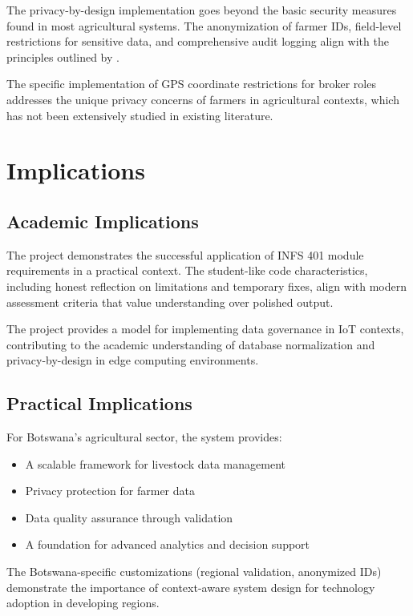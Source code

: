 The privacy-by-design implementation goes beyond the basic security measures found in most agricultural systems. The anonymization of farmer IDs, field-level restrictions for sensitive data, and comprehensive audit logging align with the principles outlined by \cite{cavoukian2011privacy}.

The specific implementation of GPS coordinate restrictions for broker roles addresses the unique privacy concerns of farmers in agricultural contexts, which has not been extensively studied in existing literature.

\section{Implications}

\subsection{Academic Implications}

The project demonstrates the successful application of INFS 401 module requirements in a practical context. The student-like code characteristics, including honest reflection on limitations and temporary fixes, align with modern assessment criteria that value understanding over polished output.

The project provides a model for implementing data governance in IoT contexts, contributing to the academic understanding of database normalization and privacy-by-design in edge computing environments.

\subsection{Practical Implications}

For Botswana's agricultural sector, the system provides:

\begin{itemize}
    \item A scalable framework for livestock data management
    \item Privacy protection for farmer data
    \item Data quality assurance through validation
    \item A foundation for advanced analytics and decision support
\end{itemize}

The Botswana-specific customizations (regional validation, anonymized IDs) demonstrate the importance of context-aware system design for technology adoption in developing regions.

